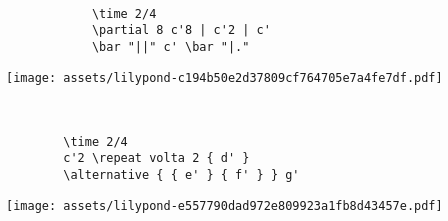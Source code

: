 \documentclass[a4paper]{tufte-handout}
\newenvironment{abjadbookoutput}{}{}
\begin{document}
\begin{description}
\begin{multicols}{2}
        \end{multicols}

    \pagebreak

    \item[Partial measures, bar line checks, bar lines:]
        \hfill \vspace{-\baselineskip} \\
        \begin{multicols}{2}

            \begin{verbatim}
            \time 2/4
            \partial 8 c'8 | c'2 | c'
            \bar "||" c' \bar "|."
            \end{verbatim}
            \vfill\null \columnbreak

            \begin{comment}
            <lilypond>
            {
                \partial 8 c'8 | c'2 | c'
                \bar "||" c' \bar "|."
            }
            </lilypond>
            \end{comment}

            \begin{abjadbookoutput}
            \noindent\texttt{[image: assets/lilypond-c194b50e2d37809cf764705e7a4fe7df.pdf]}
            \end{abjadbookoutput}

            \hfill
        \end{multicols}

    \item[Repeats:]
        \hfill \vspace{-0.5\baselineskip} \\

        \begin{verbatim}
        \time 2/4
        c'2 \repeat volta 2 { d' }
        \alternative { { e' } { f' } } g'
        \end{verbatim}

        \begin{comment}
        <lilypond>
        {
            \time 2/4
            c'2 \repeat volta 2 { d' }
            \alternative { { e' } { f' } } g'
        }
        </lilypond>
        \end{comment}

        \begin{abjadbookoutput}
        \noindent\texttt{[image: assets/lilypond-e557790dad972e809923a1fb8d43457e.pdf]}
        \end{abjadbookoutput}


\end{description}
\end{document}
